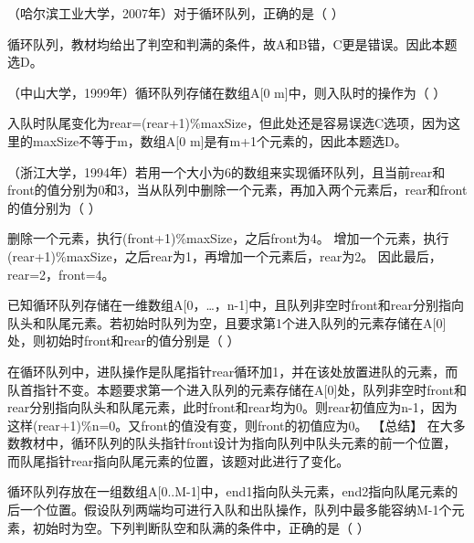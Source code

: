\question （哈尔滨工业大学，2007年）对于循环队列，正确的是（ ）
\par{}
\begin{solution}循环队列，教材均给出了判空和判满的条件，故A和B错，C更是错误。因此本题选D。
\end{solution}
\question （中山大学，1999年）循环队列存储在数组A{[}0 m{]}中，则入队时的操作为（
）
\par{}
\begin{solution}入队时队尾变化为rear=(rear+1)\%maxSize，但此处还是容易误选C选项，因为这里的maxSize不等于m，数组A{[}0
m{]}是有m+1个元素的，因此本题选D。
\end{solution}
\question （浙江大学，1994年）若用一个大小为6的数组来实现循环队列，且当前rear和front的值分别为0和3，当从队列中删除一个元素，再加入两个元素后，rear和front的值分别为（
）
\par{}
\begin{solution}删除一个元素，执行(front+1)\%maxSize，之后front为4。
增加一个元素，执行(rear+1)\%maxSize，之后rear为1，再增加一个元素后，rear为2。
因此最后，rear=2，front=4。
\end{solution}
\question 已知循环队列存储在一维数组A{[}0，\ldots{}，n-1{]}中，且队列非空时front和rear分别指向队头和队尾元素。若初始时队列为空，且要求第1个进入队列的元素存储在A{[}0{]}处，则初始时front和rear的值分别是（
）
\par{}
\begin{solution}在循环队列中，进队操作是队尾指针rear循环加1，并在该处放置进队的元素，而队首指针不变。本题要求第一个进入队列的元素存储在A{[}0{]}处，队列非空时front和rear分别指向队头和队尾元素，此时front和rear均为0。则rear初值应为n-1，因为这样(rear+1)\%n=0。又front的值没有变，则front的初值应为0。
【总结】
在大多数教材中，循环队列的队头指针front设计为指向队列中队头元素的前一个位置，而队尾指针rear指向队尾元素的位置，该题对此进行了变化。
\end{solution}
\question 循环队列存放在一组数组A{[}0..M-1{]}中，end1指向队头元素，end2指向队尾元素的后一个位置。假设队列两端均可进行入队和出队操作，队列中最多能容纳M-1个元素，初始时为空。下列判断队空和队满的条件中，正确的是（
）
\par{}
